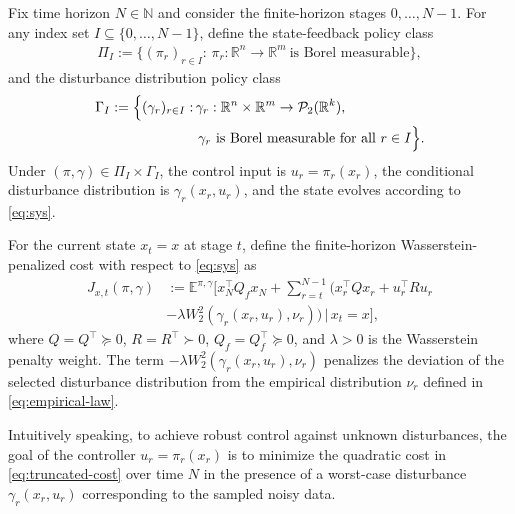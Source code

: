 \documentclass[10pt,journal,twoside]{IEEEtran}
\theoremstyle{definition}
\theoremstyle{remark}
\begin{document}
Fix time horizon \(N\in\mathbb N\) and consider the finite-horizon stages \(0,\ldots,N-1\). For any index set $I\subseteq\{0,\ldots,N-1\}$, define the state-feedback policy class
\begin{equation*}
	\begin{aligned}
		\Pi_I
		:=
		\{(\pi_r)_{r\in I}:\,
		\pi_r:\mathbb R^n\to\mathbb R^m 
		~\text{is Borel measurable}\},
	\end{aligned}
\end{equation*}
and  the disturbance distribution policy class
\begin{equation*}
	\begin{aligned}
		\Gamma_I:=\Bigl\{
		(\gamma_r)_{r\in I}:&\,
		\gamma_r:\mathbb R^n\times\mathbb R^m
		\to\mathcal P_2(\mathbb R^k),\\
		&\ \gamma_r \text{ is Borel measurable for all } r\in I
		\Bigr\}.
	\end{aligned}
\end{equation*}
 Under
\((\pi,\gamma)\in\Pi_I\times\Gamma_I\), the control input is
\(u_r=\pi_r(x_r)\), the conditional disturbance distribution is
\(\gamma_r(x_r,u_r)\),
and the state evolves according to \eqref{eq:sys}.

For the current state \(x_t=x\) at stage \(t\), define the finite-horizon
Wasserstein-penalized cost with respect to \eqref{eq:sys} as
\begin{equation}
	\begin{aligned}
		J_{x,t}(\pi,\gamma)
		&:=
		\mathbb E^{\pi,\gamma}\Bigg[
		x_N^\top Q_fx_N + \sum_{r=t}^{N-1}
		\Big(
		x_r^\top Qx_r+u_r^\top Ru_r \\
		&
		-\lambda W_2^2(\gamma_r(x_r,u_r),\nu_r)
		\Big) 
		\,\Big|\,x_t=x
		\Bigg],
	\end{aligned}
	\label{eq:truncated-cost}
\end{equation}
where
$Q=Q^\top\succeq0$,
$R=R^\top\succ0$,
$Q_f=Q_f^\top\succeq0$,
and \(\lambda>0\) is the Wasserstein penalty weight. The term \(-\lambda W_2^2(\gamma_r(x_r,u_r),\nu_r)\) penalizes the deviation of the selected disturbance distribution from the empirical distribution $\nu_r$ defined in \eqref{eq:empirical-law}.

Intuitively speaking, to achieve robust control against unknown disturbances, the goal of the controller  $u_r=\pi_r(x_r)$ is to minimize the quadratic cost in \eqref{eq:truncated-cost} over time $N$ in the presence of a worst-case disturbance $\gamma_r(x_r,u_r)$ corresponding to the sampled noisy data.
\end{document}
